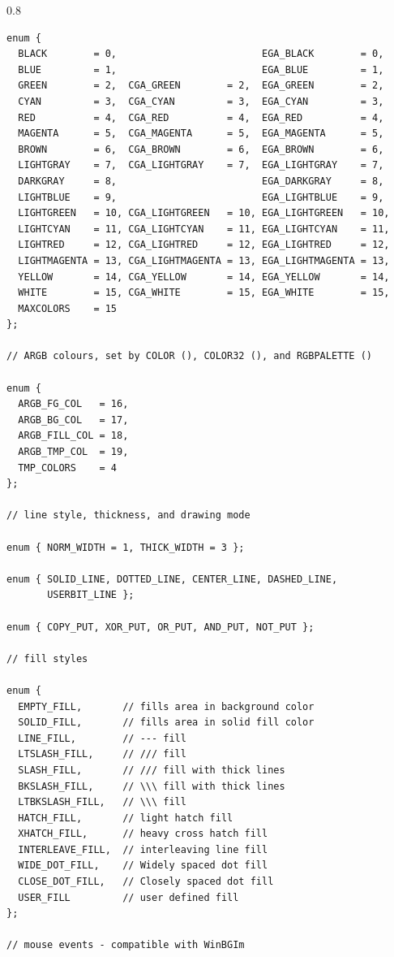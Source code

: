 \documentclass[a4paper,12pt]{article}
\newenvironment{margins}[2]
{ %
\begin{list}{}
{
\setlength{\leftmargin}{#1}
\setlength{\rightmargin}{#2}
} \item
} %
{\end{list}}
\begin{document}
\begin{margins}{-0.5cm}{-0.5cm}
\begin{spacing}{0.8}
\begin{lstlisting}
enum {
  BLACK        = 0,                         EGA_BLACK        = 0,
  BLUE         = 1,                         EGA_BLUE         = 1,
  GREEN        = 2,  CGA_GREEN        = 2,  EGA_GREEN        = 2,
  CYAN         = 3,  CGA_CYAN         = 3,  EGA_CYAN         = 3,
  RED          = 4,  CGA_RED          = 4,  EGA_RED          = 4,
  MAGENTA      = 5,  CGA_MAGENTA      = 5,  EGA_MAGENTA      = 5,
  BROWN        = 6,  CGA_BROWN        = 6,  EGA_BROWN        = 6,
  LIGHTGRAY    = 7,  CGA_LIGHTGRAY    = 7,  EGA_LIGHTGRAY    = 7,
  DARKGRAY     = 8,                         EGA_DARKGRAY     = 8,
  LIGHTBLUE    = 9,                         EGA_LIGHTBLUE    = 9,
  LIGHTGREEN   = 10, CGA_LIGHTGREEN   = 10, EGA_LIGHTGREEN   = 10,
  LIGHTCYAN    = 11, CGA_LIGHTCYAN    = 11, EGA_LIGHTCYAN    = 11,
  LIGHTRED     = 12, CGA_LIGHTRED     = 12, EGA_LIGHTRED     = 12,
  LIGHTMAGENTA = 13, CGA_LIGHTMAGENTA = 13, EGA_LIGHTMAGENTA = 13,
  YELLOW       = 14, CGA_YELLOW       = 14, EGA_YELLOW       = 14,
  WHITE        = 15, CGA_WHITE        = 15, EGA_WHITE        = 15,
  MAXCOLORS    = 15
};

// ARGB colours, set by COLOR (), COLOR32 (), and RGBPALETTE ()

enum {
  ARGB_FG_COL   = 16,
  ARGB_BG_COL   = 17,
  ARGB_FILL_COL = 18,
  ARGB_TMP_COL  = 19,
  TMP_COLORS    = 4
};

// line style, thickness, and drawing mode

enum { NORM_WIDTH = 1, THICK_WIDTH = 3 };

enum { SOLID_LINE, DOTTED_LINE, CENTER_LINE, DASHED_LINE,
       USERBIT_LINE };

enum { COPY_PUT, XOR_PUT, OR_PUT, AND_PUT, NOT_PUT };

// fill styles

enum {
  EMPTY_FILL,       // fills area in background color
  SOLID_FILL,       // fills area in solid fill color
  LINE_FILL,        // --- fill
  LTSLASH_FILL,     // /// fill
  SLASH_FILL,       // /// fill with thick lines
  BKSLASH_FILL,     // \\\ fill with thick lines
  LTBKSLASH_FILL,   // \\\ fill
  HATCH_FILL,       // light hatch fill
  XHATCH_FILL,      // heavy cross hatch fill
  INTERLEAVE_FILL,  // interleaving line fill
  WIDE_DOT_FILL,    // Widely spaced dot fill
  CLOSE_DOT_FILL,   // Closely spaced dot fill
  USER_FILL         // user defined fill
};

// mouse events - compatible with WinBGIm


\end{lstlisting}
\end{spacing}
\end{margins}
\end{document}
